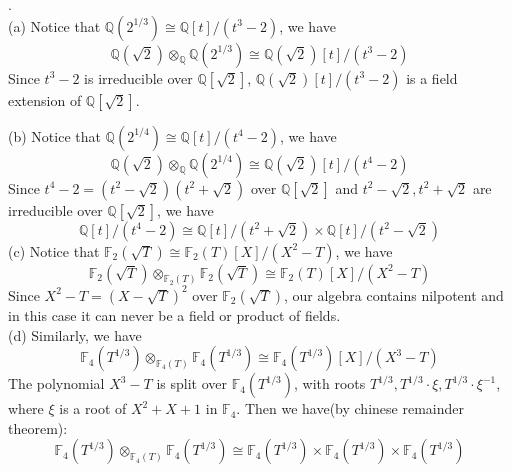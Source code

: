 \documentclass[11pt,a4paper]{ctexart}
\begin{document}
.\\
(a) Notice that $\mathbb{Q}(2^{1/3})\cong\mathbb{Q}[t]/(t^3-2)$, we have
$$\mathbb{Q}(\sqrt{2})\otimes_{\mathbb{Q}}\mathbb{Q}(2^{1/3})\cong\mathbb{Q}(\sqrt{2})[t]/(t^3-2)$$
Since $t^3-2$ is irreducible over $\mathbb{Q}[\sqrt{2}]$, $\mathbb{Q}(\sqrt{2})[t]/(t^3-2)$ is a field extension of $\mathbb{Q}[\sqrt{2}]$.

\newpage
\noindent(b) Notice that $\mathbb{Q}(2^{1/4})\cong\mathbb{Q}[t]/(t^4-2)$, we have
$$\mathbb{Q}(\sqrt{2})\otimes_{\mathbb{Q}}\mathbb{Q}(2^{1/4})\cong\mathbb{Q}(\sqrt{2})[t]/(t^4-2)$$
Since $t^4-2=(t^2-\sqrt{2})(t^2+\sqrt{2})$ over $\mathbb{Q}[\sqrt{2}]$ and $t^2-\sqrt{2},t^2+\sqrt{2}$ are irreducible over $\mathbb{Q}[\sqrt{2}]$, we have
$$\mathbb{Q}[t]/(t^4-2)\cong\mathbb{Q}[t]/(t^2+\sqrt{2})\times\mathbb{Q}[t]/(t^2-\sqrt{2})$$
(c) Notice that $\mathbb{F}_2(\sqrt{T})\cong\mathbb{F}_2(T)[X]/(X^2-T)$, we have
$$\mathbb{F}_2(\sqrt{T})\otimes_{\mathbb{F}_2(T)}\mathbb{F}_2(\sqrt{T})\cong\mathbb{F}_2(T)[X]/(X^2-T)$$
Since $X^2-T=(X-\sqrt{T})^2$ over $\mathbb{F}_2(\sqrt{T})$, our algebra contains nilpotent and in this case it can never be a field or product of fields.\\
(d) Similarly, we have
$$\mathbb{F}_4(T^{1/3})\otimes_{\mathbb{F}_4(T)}\mathbb{F}_4(T^{1/3})\cong\mathbb{F}_4(T^{1/3})[X]/(X^3-T)$$
The polynomial $X^3-T$ is split over $\mathbb{F}_4(T^{1/3})$, with roots $T^{1/3},T^{1/3}\cdot\xi,T^{1/3}\cdot\xi^{-1}$, where $\xi$ is a root of $X^2+X+1$ in $\mathbb{F}_4$. Then we have(by chinese remainder theorem):
$$\mathbb{F}_4(T^{1/3})\otimes_{\mathbb{F}_4(T)}\mathbb{F}_4(T^{1/3})\cong\mathbb{F}_4(T^{1/3})\times\mathbb{F}_4(T^{1/3})\times\mathbb{F}_4(T^{1/3})$$
\end{document}
